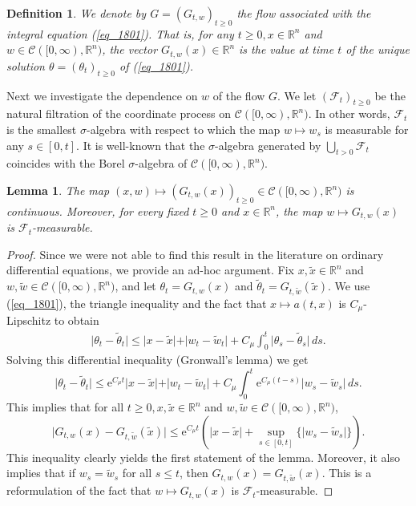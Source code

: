 \documentclass[12pt,a4paper]{article}
\newcommand{\e}{\mathrm{e}}
\newcommand{\RR}{\mathbb{R}}
\newcommand{\R}{\mathbb{R}}
\newcommand{\cC}{\mathcal C}
\renewcommand{\tilde}{\widetilde}
\newtheorem{definition}[theorem]{Definition}
\newtheorem{lemma}[theorem]{Lemma}
\theoremstyle{definition}
\begin{document}
%
\begin{definition} We denote by $G = (G_{t,w})_{t \geq 0}$ the flow associated with the integral equation (\ref{eq_1801}). That is, 
for any $t \geq 0, x\in \RR^n$ and $w \in \cC([0, \infty), \RR^n)$, the vector $G_{t,w}(x) \in \RR^n$  is the value at time $t$ of the unique solution $\theta = (\theta_t)_{t \geq 0}$ of (\ref{eq_1801}).
\label{def_1607}
\end{definition}
%
Next we investigate the dependence on $w$ of the flow $G$.
We let $(\mathcal F_t)_{t \geq 0}$ be the natural filtration of the coordinate
process on $\mathcal C ([0,\infty) , \R^n )$. In other words,
$\mathcal F_t$ is the smallest $\sigma$-algebra with respect to which the
map $w \mapsto w_s$ is measurable for any $s \in [0,t]$. It is
well-known that the $\sigma$-algebra generated by
$\bigcup_{t>0} \mathcal F_t$ coincides with the Borel $\sigma$-algebra
of $\mathcal C ([0,\infty), \R^n)$.
%
\begin{lemma} \label{lem_1300}
The map $(x,w ) \mapsto (G_ {t,w} (x))_{t\geq 0} \in \mathcal C ([0,\infty) , \R^n )$
is continuous. Moreover, for every fixed $t\geq 0$ and $x\in \R^n$,
the map $w \mapsto G_{t,w} (x)$ is $\mathcal F_t$-measurable.
\end{lemma}
%
\begin{proof} Since we were not able to find this result in the literature
on ordinary differential equations, we provide an ad-hoc argument.
Fix $x,\tilde x \in \R^n$ and $w,\tilde w \in \mathcal C ([0,\infty) ,\R^n)$,
and let $\theta_t = G_{t,w} (x)$ and $\tilde \theta_t = G_{t,\tilde w} (\tilde x)$. We use (\ref{eq_1801}), the triangle inequality
and the fact that $x\mapsto a(t,x)$ is $C_\mu$-Lipschitz to obtain
\[
\begin{split}
\vert \theta_t -\tilde \theta_t \vert
\leq \vert x-\tilde x \vert +
\vert  w_t - \tilde w_t \vert +
C_\mu \int_0^t  \vert \theta_s -\tilde \theta_s \vert \, ds .
\end{split}
\]
Solving this differential inequality (Gronwall's lemma) we get
\[
\vert \theta_t - \tilde \theta_t \vert
\leq \e^{C_\mu t} \vert x-\tilde x\vert
+ \vert w_t - \tilde w_t \vert + C_\mu \int_{0}^t \e^{ C_\mu (t-s) } \vert w_s - \tilde w_s \vert \, ds .
\]
This implies that for all $t \geq 0, x,\tilde x \in \R^n$ and $w,\tilde w \in \mathcal C ([0,\infty), \R^n)$,
\begin{equation}\label{eq_1301}
\vert G_{t,w} (x) - G_{t,\tilde w} (\tilde x) \vert \leq \e^{C_\mu t} \left( \vert x-\tilde x\vert
+ \sup_{s\in [0,t]} \{ \vert w_s - \tilde w_s \vert \} \right). 
\end{equation}
This inequality clearly yields the first statement of the lemma.
Moreover, it also
implies that if $w_s = \tilde w_s$ for all $s\leq t$,
then $G_{t, w}(x) = G_{t, \tilde w}(x)$. This
is a reformulation of the fact that $w \mapsto G_{t,w} (x)$ is
$\mathcal F_t$-measurable.
\end{proof}
\end{document}
